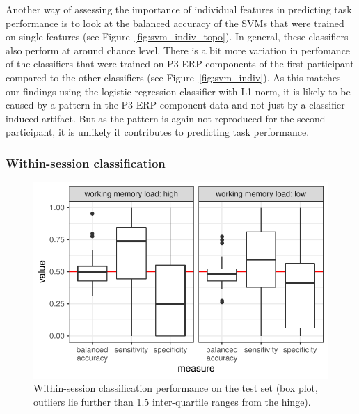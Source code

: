 Another way of assessing the importance of individual features in predicting
task performance is to look at the balanced accuracy of the SVMs that were
trained on single features (see Figure~\ref{fig:svm_indiv_topo}). In general,
these classifiers also perform at around chance level. There is a bit more
variation in perfomance of the classifiers that were trained on P3 ERP
components of the first participant compared to the other classifiers (see
Figure~\ref{fig:svm_indiv}). As this matches our findings using the logistic
regression classifier with L1 norm, it is likely to be caused by a pattern in
the P3 ERP component data and not just by a classifier induced artifact. But as
the pattern is again not reproduced for the second participant, it is unlikely
it contributes to predicting task performance.

\subsubsection{Within-session classification}

\begin{figure}[!htpb]
  \includegraphics[width=\linewidth]{../stats/results/within_dyad_summary.pdf}
  \caption{Within-session classification performance on the test set (box plot, outliers lie further than 1.5 inter-quartile ranges from the hinge).}
  \label{fig:within_dyad_summary}
\end{figure}

